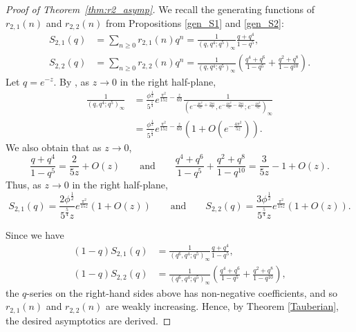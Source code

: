 \documentclass[11pt,reqno]{amsart}
\theoremstyle{remark}
\numberwithin{equation}{section}
\begin{document}
\begin{proof}[Proof of Theorem~\ref{thm:r2_asymp}]
We recall the generating functions of $r_{2,1}(n)$ and $r_{2,2}(n)$ from Propositions \ref{gen_S1} and \ref{gen_S2}:
\begin{align*}
	S_{2,1}(q)&=\sum_{n\ge 0} r_{2,1}(n) q^n = \frac{1}{(q, q^4;q^5)_{\infty}} \frac{q+q^4}{1-q^{5}}, \\
	S_{2,2}(q)&=\sum_{n\ge 0} r_{2,2}(n) q^n  =\frac{1}{(q,q^4;q^5)_{\infty}} \left( \frac{q^4+q^6}{1-q^5}+ \frac{q^2+q^{8}}{1-q^{10}} \right).
\end{align*}
Let $q=e^{-z}$. By \cite[Corollary 1.4]{K}, as $z \to 0$ in the right half-plane,
\begin{align*}
	\frac{1}{(q,q^4;q^5)_\infty} &= \frac{\phi^{\frac12}}{5^{\frac14}}e^{\frac{\pi^2}{15z}-\frac{z}{60}} \frac{1}{\left(e^{-\frac{4\pi^2}{5z}+\frac{2\pi i}{5}}, e^{-\frac{4\pi^2}{5z}-\frac{2\pi i}{5}}; e^{-\frac{4\pi^2}{5z}}\right)_\infty}\\
	&= \frac{\phi^{\frac12}}{5^{\frac14}}e^{\frac{\pi^2}{15z}-\frac{z}{60}} \left( 1+ O\left( e^{-\frac{4\pi^2}{5z}}\right) \right).
\end{align*}
We also obtain that as $z \to 0$,
\[
	\frac{q + q^4}{1-q^5} = \frac{2}{5z} + O(z) \qquad\text{and}\qquad  \frac{q^4+q^6}{1-q^5} + \frac{q^2+q^8}{1-q^{10}} = \frac{3}{5z} -1 + O(z).
\]
Thus, as $z \to 0$ in the right half-plane,
\[
	S_{2,1}(q) = \frac{2\phi^{\frac12}}{5^{\frac54}z}e^{\frac{\pi^2}{15z}} \left( 1+ O(z)\right) \qquad \text{and}\qquad S_{2,2}(q) = \frac{3\phi^{\frac12}}{5^{\frac54}z}e^{\frac{\pi^2}{15z}} \left( 1+ O(z)\right).
\]

Since we have 
\begin{align*}
	(1-q)S_{2,1}(q) &= \frac{1}{(q^6, q^4;q^5)_{\infty}} \frac{q+q^4}{1-q^{5}},\\
	(1-q)S_{2,2}(q) &= \frac{1}{(q^6,q^4;q^5)_{\infty}} \left( \frac{q^4+q^6}{1-q^5}+ \frac{q^2+q^{8}}{1-q^{10}} \right),
\end{align*}
the $q$-series on the right-hand sides above has non-negative coefficients, and so 
$r_{2,1}(n)$ and $r_{2,2}(n)$ are weakly increasing. Hence, by Theorem \ref{Tauberian}, the desired asymptotics are derived.
\end{proof}
\end{document}
